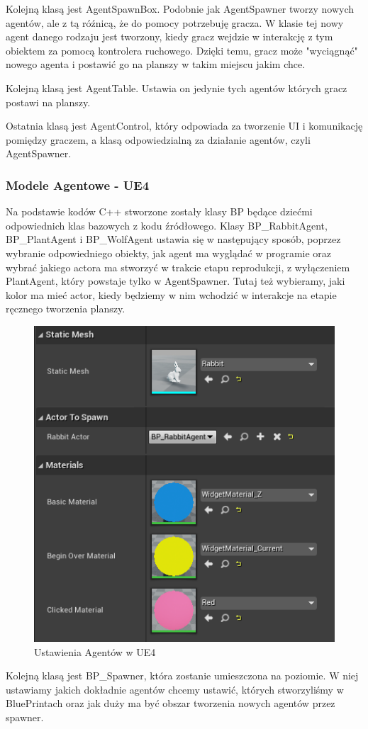 \documentclass[a4paper,12pt,reqno]{article}
\begin{document}
Kolejną klasą jest AgentSpawnBox. Podobnie jak AgentSpawner tworzy nowych agentów, ale z tą róźnicą, że do pomocy potrzebuję gracza. W klasie tej nowy agent danego rodzaju jest tworzony, kiedy gracz wejdzie w interakcję z tym obiektem za pomocą kontrolera ruchowego. Dzięki temu, gracz może "wyciągnąć" nowego agenta i postawić go na planszy w takim miejscu jakim chce. 

Kolejną klasą jest AgentTable. Ustawia on jedynie tych agentów których gracz postawi na planszy.

Ostatnia klasą jest AgentControl, który odpowiada za tworzenie UI i komunikację pomiędzy graczem, a klasą odpowiedzialną za działanie agentów, czyli AgentSpawner. 

\subsubsection{Modele Agentowe - UE4}

Na podstawie kodów C++ stworzone zostały klasy BP będące dziećmi odpowiednich klas bazowych z kodu źródłowego. Klasy BP\_RabbitAgent, BP\_PlantAgent i BP\_WolfAgent ustawia się w następujący sposób, poprzez wybranie odpowiedniego obiekty, jak agent ma wyglądać w programie oraz wybrać jakiego actora ma stworzyć w trakcie etapu reprodukcji, z wyłączeniem PlantAgent, który powstaje tylko w AgentSpawner. Tutaj też wybieramy, jaki kolor ma mieć actor, kiedy będziemy w nim wchodzić w interakcje na etapie ręcznego tworzenia planszy.

\begin{figure}[H]%
\centering
\includegraphics[width=0.4\columnwidth]{graphics//agent/BP_AgentActor.png}
\caption{Ustawienia Agentów w UE4 
\label{BPExample}}%
%
\qquad
\end{figure} 


Kolejną klasą jest BP\_Spawner, która zostanie umieszczona na poziomie. W niej ustawiamy jakich dokładnie agentów chcemy ustawić, których stworzyliśmy w BluePrintach oraz jak duży ma być obszar tworzenia nowych agentów przez spawner.
\end{document}
